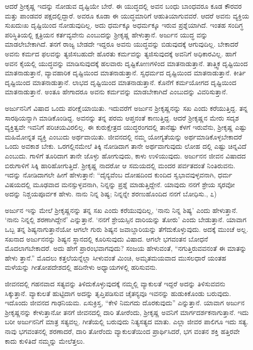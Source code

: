ಆದರೆ ಶ್ರೀಕೃಷ್ಣ ಇದನ್ನು ನೋಡುವ ದೃಷ್ಟಿಯೇ ಬೇರೆ. ಈ ಯುದ್ಧದಲ್ಲಿ ಅವನ ಬಂಧು ಬಾಂಧವರೂ ಕೂಡ ಕೌರವರ ಮತ್ತು ಪಾಂಡವರ ಪಕ್ಷದಲ್ಲಿದ್ದಾರೆ. ಅವರೂ ಕೂಡಾ ಈ ಯುದ್ಧಮಾರಿಗೆ ಆಹುತಿಯಾಗುವವರೆ. ಆದರೆ ಅವನು ವ್ಯಕ್ತಿಯ ಸುಖದುಃಖ ದೃಷ್ಟಿಯಿಂದ ನೋಡುವುದಿಲ್ಲ. ಅದು ಧರ್ಮಕ್ಕೂ ಅಧರ್ಮಕ್ಕೂ ಇರುವ ಪ್ರಶ್ನೆಯಾಗಿದೆ. ಇಂತಹ ಸಂದಿಗ್ಧ ಪರಿಸ್ಥಿತಿಯಲ್ಲಿ ಕ್ಷತ್ರಿಯನ ಕರ್ತವ್ಯವೇನು ಎಂಬುದನ್ನು ಶ್ರೀಕೃಷ್ಣ ಹೇಳುತ್ತಾನೆ. ಅರ್ಜುನ ಯುದ್ಧ ವನ್ನು ಮಾಡಲೇಬೇಕಾಗಿದೆ. ತನಗೆ ರಾಜ್ಯ ಬೇಡದೇ ಇದ್ದರೂ ಅವನು ಯುದ್ಧವನ್ನು ಬಿಡುವುದಕ್ಕೆ ಆಗುವುದಿಲ್ಲ. ಬೇಕಾದರೆ ಅವನು ಕರ್ಮದ ಫಲವನ್ನು ತ್ಯಜಿಸಬಹುದೇ ಹೊರತು ಕರ್ಮವನ್ನು ತ್ಯಜಿಸುವುದಕ್ಕೆ ಅವನಿಗೆ ಅಧಿಕಾರವಿಲ್ಲ. ಹಾಗೆ ಅವನ ಕೈಯಲ್ಲಿ ಯುದ್ಧವನ್ನು ಮಾಡಿಸುವುದಕ್ಕೆ ಹಲವಾರು ದೃಷ್ಟಿಕೋಣಗಳಿಂದ ಮಾತನಾಡುತ್ತಾನೆ. ತಾತ್ತ್ವಿಕ ದೃಷ್ಟಿಯಿಂದ ಮಾತನಾಡುತ್ತಾನೆ, ವ್ಯಾವಹಾರಿಕ ದೃಷ್ಟಿಯಿಂದ ಮಾತನಾಡುತ್ತಾನೆ. ಸ್ವಧರ್ಮದ ದೃಷ್ಟಿಯಿಂದ ಮಾತನಾಡುತ್ತಾನೆ. ಕೀರ್ತಿ ದೃಷ್ಟಿಯಿಂದ ಮಾತನಾಡುತ್ತಾನೆ. ಲಾಭದ ದೃಷ್ಟಿಯಿಂದ ಮಾತನಾಡುತ್ತಾನೆ. ಕೊನೆಗೆ ಕರ್ಮಯೋಗದ ದೃಷ್ಟಿಯಿಂದ ಮಾತನಾಡುತ್ತಾನೆ. ಅಂತೂ ಹೇಗಾದರೂ ಅವನು ಕರ್ಮವನ್ನು ಮಾಡಬೇಕಾಗಿದೆ ಎಂಬುದನ್ನು ವಿವರಿಸುತ್ತಾನೆ.

ಅರ್ಜುನನಿಗೆ ವಿಷಾದ ಒಂದು ಪರೀಕ್ಷೆಯಾಯಿತು. ಇದುವರೆಗೆ ಅರ್ಜುನ ಶ್ರೀಕೃಷ್ಣನನ್ನು ಸಖ ಎಂದು ಕರೆಯುತ್ತಿದ್ದ. ತನ್ನ ಸಾರಥಿಯನ್ನಾಗಿ ಮಾಡಿಕೊಂಡಿದ್ದ. ಅವನನ್ನು ತನ್ನ ಪರಮ ಆಪ್ತನಂತೆ ಕಾಣುತ್ತಿದ್ದ. ಆದರೆ ಶ್ರೀಕೃಷ್ಣನ ಮೇರು ಸದೃಶ ವ್ಯಕ್ತಿತ್ವವೇ ಇವನಿಗೆ ಪರಿಚಯವಿರಲಿಲ್ಲ. ಈ ಕುರುಕ್ಷೇತ್ರದ ಯುದ್ಧರಂಗದಲ್ಲಿ ತಾನೆಷ್ಟು ಕೆಳಗೆ ಇರುವೆನು, ಶ್ರೀಕೃಷ್ಣ ಎಷ್ಟು ಮಹಿಮೋನ್ನತ ವ್ಯಕ್ತಿ ಎಂಬುದು ಅರ್ಥವಾಯಿತು. ಜೀವನದಲ್ಲಿ ನಮ್ಮ ಯೋಗ್ಯತೆಯನ್ನು ಅರ್ಥಮಾಡಿಕೊಳ್ಳಬೇಕಾದರೆ ಒಂದು ಅವಕಾಶ ಬೇಕು. ಒರಗಲ್ಲಿನಮೇಲೆ ತಿಕ್ಕಿ ನೋಡಿದಾಗ ತಾನೇ ಅರ್ಥವಾಗುವುದು ಲೋಹ ದಲ್ಲಿ ಎಷ್ಟು ಚಿನ್ನವಿದೆ ಎಂಬುದು. ಗಾಳಿಗೆ ತೂರಿದಾಗ ತಾನೇ ಜೊಳ್ಳು ಹೋಗುವುದು, ಕಾಳು ಉಳಿಯುವುದು. ಅರ್ಜುನನ ಜೀವನ ವಿಷಾದದ ಬಿರುಗಾಳಿಗೆ ಸಿಕ್ಕಿ ಹಾರಿಹೋಗುತ್ತಿದೆ. ಶ್ರೀಕೃಷ್ಣ ನಾದರೋ ಆ ಸಮಯದಲ್ಲಿ ಮಂದರ ಪರ್ವತದಂತೆ ನಿಂತಿರುವನು. ಇದನ್ನು ನೋಡಿದಾಗಲೇ ಹೀಗೆ ಹೇಳುತ್ತಾನೆ: “ದೈನ್ಯವೆಂಬ ದೋಷದಿಂದ ಕುಂದಿದ ಸ್ವಭಾವವುಳ್ಳವನಾಗಿ, ಧರ್ಮ ವಿಷಯದಲ್ಲಿ ಮೂಢವಾದ ಮನಸ್ಸುಳ್ಳವನಾಗಿ, ನಿನ್ನನ್ನು ಪ್ರಶ್ನೆ ಮಾಡುತ್ತಿದ್ದೇನೆ. ಯಾವುದು ನನಗೆ ಶ್ರೇಯ ಸ್ಕರವೋ ಅದನ್ನು ನಿಶ್ಚಯಪೂರ್ವಕ ಹೇಳು. ನಾನು ನಿನ್ನ ಶಿಷ್ಯ; ನಿನ್ನನ್ನೇ ಶರಣುಹೊಂದಿದ ನನಗೆ ಬೋಧಿಸು., ೭)

ಅರ್ಜುನ ಇನ್ನು ಮೇಲೆ ಶ್ರೀಕೃಷ್ಣನನ್ನು ತನ್ನ ಸಖ ಎಂದು ಕರೆಯುವುದಿಲ್ಲ, ‘ನಾನು ನಿನ್ನ ಶಿಷ್ಯ’ ಎಂದು ಹೇಳುತ್ತಾನೆ. ‘ನಾನು ನಿನ್ನಲ್ಲಿ ಶರಣಾಗಿದ್ದೇನೆ’ ಎನ್ನುತ್ತಾನೆ. ‘ನನಗೆ ಶ್ರೇಯಸ್ಸಿನ ದಾರಿಯನ್ನು ತೋರು’ ಎಂದು ಬೇಡುತ್ತಾನೆ. ಯಾವಾಗ ಒಬ್ಬ ತನ್ನ ಶಿಷ್ಯನಾಗುತ್ತಾನೆಯೋ ಆಗಲೇ ಗುರು ಶಿಷ್ಯನ ಜವಾಬ್ದಾರಿಯನ್ನು ತೆಗೆದುಕೊಳ್ಳುವುದು. ಅದಕ್ಕೆ ಮುಂಚೆ ಅಲ್ಲ. ಸಖನಾದ ಅರ್ಜುನನನ್ನು ಶಿಷ್ಯನ ಸ್ಥಾನದಲ್ಲಿ ಕೂರಿಸುವುದು ವಿಷಾದ. ಆಗಲೇ ಭಗವಂತನ ಬೋಧನೆ ಮೊದಲಾಗಬೇಕಾದರೆ. ಅದು ಹೇಗೆ ಪ್ರಾರಂಭವಾಗವುದು? ಸಂಜಯ ಹೇಳುವಂತೆ, “ನಗುತ್ತಿರುವವನಂತೆ ಈ ಮಾತನ್ನು ಹೇಳು ತ್ತಾನೆ.” ಮೊದಲು ಕತ್ತಲೆಯನ್ನೆಲ್ಲಾ ಸೀಳುವಂತೆ ಮಿಂಚಿ, ಅಮೃತಮಯವಾದ ಮುಸಲಧಾರೆ ಯಂತಹ ಮಳೆಯನ್ನು ಗೀತೋಪದೇಶದಲ್ಲಿ ಹದಿನೇಳು ಅಧ್ಯಾಯಗಳಲ್ಲಿ ಹರಿಸುವನು.

ಜೀವನದಲ್ಲಿ ಗಹನವಾದ ಸತ್ಯವನ್ನು ತಿಳಿದುಕೊಳ್ಳುವುದಕ್ಕೆ ನಮ್ಮಲ್ಲಿ ವ್ಯಾಕುಲತೆ ಇದ್ದರೆ ಅದನ್ನು ತಿಳಿಸುವವನು ಸಿಕ್ಕುತ್ತಾನೆ. ವ್ಯಾಕುಲತೆ ಹುಟ್ಟಿದಾಗ ಅದನ್ನು ತೃಪ್ತಿಪಡಿಸುವ ಚೈತನ್ಯವೂ ಇವನನ್ನು ಹುಡುಕಿಕೊಂಡು ಬರುವುದು. ಇದೊಂದು ಜೀವನದ ಗಾಢನಿಯಮ. ಏಸುಕ್ರಿಸ್ತ, “ಕೇಳಿ ನಿಮಗದು ದೊರಕುವುದು” ಎನ್ನುತ್ತಾನೆ. ಯಾವಾಗ ಅರ್ಜುನ ಶ್ರೀಕೃಷ್ಣನನ್ನು ಕೇಳುತ್ತಾನೋ ತನಗೆ ಜೀವನದಲ್ಲಿ ದಾರಿ ತೋರೆಂದು, ಶ್ರೀಕೃಷ್ಣ ಅವನಿಗೆ ಮಾರ್ಗದರ್ಶಕನಾಗುತ್ತಾನೆ. ಇದು ಬರೀ ಅರ್ಜುನನಿಗೆ ಮಾತ್ರ ಸತ್ಯವಲ್ಲ. ಗೀತೆಯಲ್ಲಿ ಬರುವುದು ನಿತ್ಯಸತ್ಯದ ಮಾತು. ಎಲ್ಲಾ ಜೀವರ ಪಾಲಿಗೂ ಇದು ಸತ್ಯ. ನಾವು ಭಗವಂತನಲ್ಲಿ ಶರಣಾದರೆ, ದಾರಿ ತೋರೆಂದು ವ್ಯಾಕುಲತೆಯಿಂದ ಪ್ರಾರ್ಥಿಸಿದರೆ, ಭಗ ವಂತನ ಶಕ್ತಿ ಹತ್ತಿರವೇ ಕಾದು ಕುಳಿತಿದೆ ನಮ್ಮನ್ನು ಮೇಲೆತ್ತಲು.


